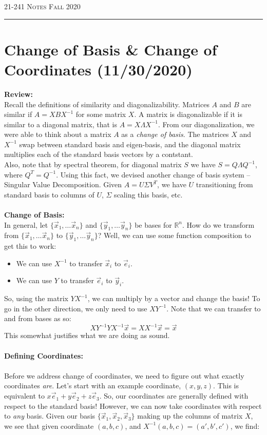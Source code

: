 \documentclass[12pt]{amsart}
\begin{document}
\thispagestyle{empty}

{\scshape 21-241} \hfill {\scshape \Large Notes} \hfill {\scshape Fall 2020}
\medskip
\hrule
\bigskip

\section*{Change of Basis \& Change of Coordinates (11/30/2020)}
\textbf{Review:}\\
Recall the definitions of similarity and diagonalizability. Matrices $A$ and $B$ are similar if $A = XBX^{-1}$ for some matrix $X$. A matrix is diagonalizable if it is similar to a diagonal matrix, that is $A=X\Lambda X^{-1}$. From our diagonalization, we were able to think about a matrix $A$ as a \textit{change of basis}. The matrices $X$ and $X^{-1}$ swap between standard basis and eigen-basis, and the diagonal matrix multiplies each of the standard basis vectors by a contstant.\\
Also, note that by spectral theorem, for diagonal matrix $S$ we have $S = Q\Lambda Q^{-1}$, where $Q^T=Q^{-1}$. Using this fact, we devised another change of basis system -- Singular Value Decomposition. Given $A = U\Sigma V^T$, we have $U$ transitioning from standard basis to columns of $U$, $\Sigma$ scaling this basis, etc.\\ \\
\textbf{Change of Basis:}\\
In general, let $\{\vec{x}_1, \dots \vec{x}_n\}$ and $\{\vec{y}_1, \dots \vec{y}_n\}$ be bases for $\mathbb{R}^{n}$. How do we transform from $\{\vec{x}_1, \dots \vec{x}_n\}$ to $\{\vec{y}_1, \dots \vec{y}_n\}$? Well, we can use some function composition to get this to work:
\begin{itemize}
	\item We can use $X^{-1}$ to transfer $\vec{x}_i$ to $\vec{e}_i$.
	\item We can use $Y$ to transfer $\vec{e}_i$ to $\vec{y}_i$.
\end{itemize}
So, using the matrix $YX^{-1}$, we can multiply by a vector and change the basis! To go in the other direction, we only need to use $XY^{-1}$. Note that we can transfer to and from bases as so:
\[XY^{-1}YX^{-1}\vec{x} = XX^{-1}\vec{x} = \vec{x}\]
This somewhat justifies what we are doing as sound.\\ \\
\textbf{Defining Coordinates:}\\ \\
Before we address change of coordinates, we need to figure out what exactly coordinates \textit{are}. Let's start with an example coordinate, $(x, y, z)$. This is equivalent to $x\vec{e}_1+y\vec{e}_2+z\vec{e}_3$. So, our coordinates are generally defined with respect to the standard basis! However, we can now take coordinates with respect to \textit{any} basis. Given our basis $\{\vec{x}_1, \vec{x}_2, \vec{x}_3\}$ making up the columns of matrix $X$, we see that given coordinate $(a, b, c)$, and $X^{-1}(a,b,c) = (a', b', c')$, we find:
\end{document}
